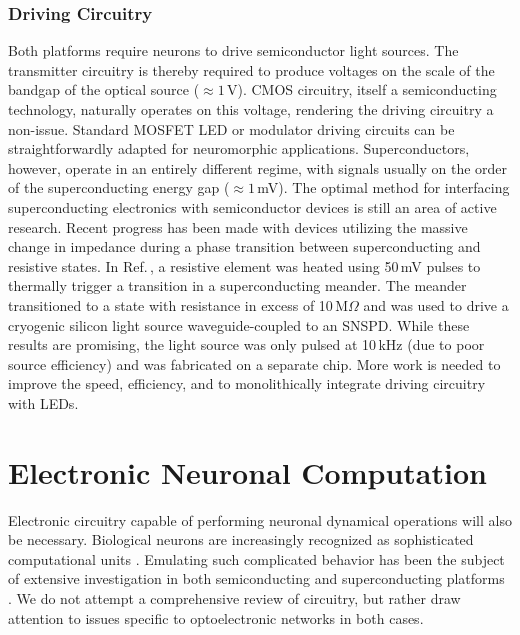 \documentclass[twocolumn]{article}
\begin{document}
\subsubsection{Driving Circuitry}
Both platforms require neurons to drive semiconductor light sources. The transmitter circuitry is thereby required to produce voltages on the scale of the bandgap of the optical source ($\approx 1$\,V). CMOS circuitry, itself a semiconducting technology, naturally operates on this voltage, rendering the driving circuitry a non-issue. Standard MOSFET LED or modulator driving circuits \cite{bowers2016recent, halbritter2014high} can be straightforwardly adapted for neuromorphic applications. Superconductors, however, operate in an entirely different regime, with signals usually on the order of the superconducting energy gap ($\approx 1$\,mV). The optimal method for interfacing superconducting electronics with semiconductor devices is still an area of active research. Recent progress has been made with devices utilizing the massive change in impedance during a phase transition between superconducting and resistive states. In Ref.\,, a resistive element was heated using 50\,mV pulses to thermally trigger a transition in a superconducting meander. The meander transitioned to a state with resistance in excess of 10\,M$\Omega$ and was used to drive a cryogenic silicon light source waveguide-coupled to an SNSPD. While these results are promising, the light source was only pulsed at 10\,kHz (due to poor source efficiency) and was fabricated on a separate chip. More work is needed to improve the speed, efficiency, and to monolithically integrate driving circuitry with LEDs.

\section{\label{sec:soma}Electronic Neuronal Computation}
Electronic circuitry capable of performing neuronal dynamical operations will also be necessary. Biological neurons are increasingly recognized as sophisticated computational units \cite{kose2000,stsp2015,haah2016,sava2017}. Emulating such complicated behavior has been the subject of extensive investigation in both semiconducting \cite{voma2007,indiveri2011neuromorphic,pfgr2013,brne2013,bega2014,abta2019} and superconducting platforms \cite{shainline2019fluxonic, crotty2010josephson, toomey2019design}. We do not attempt a comprehensive review of circuitry, but rather draw attention to issues specific to optoelectronic networks in both cases.
\end{document}
